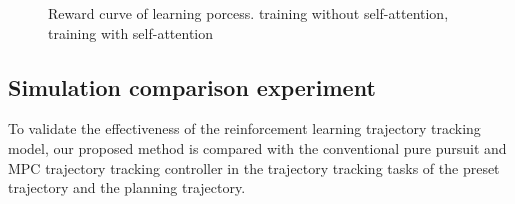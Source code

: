 \documentclass[sn-mathphys]{sn-jnl}%
\theoremstyle{thmstyleone}%
\theoremstyle{thmstyletwo}%
\theoremstyle{thmstylethree}%
\begin{document}
\begin{figure}[!htbp]
	\centering
	\quad
	
	\caption{Reward curve of learning porcess. \protect{} training without self-attention,\protect{} training with self-attention}
	\label{Fig:reward}
\end{figure}

\subsection{Simulation comparison experiment}
To validate the effectiveness of the reinforcement learning trajectory tracking model, our proposed method is compared with the conventional pure pursuit and MPC trajectory tracking controller in the trajectory tracking tasks of the preset trajectory and the planning trajectory.
\end{document}
